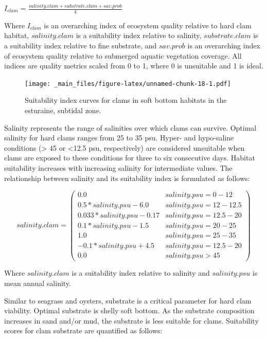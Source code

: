 \documentclass[
]{book}
\begin{document}
\(I_{clam} = \frac{salinity.clam + substrate.clam + sav.prob}{4}\)

Where \(I_{clam}\) is an overarching index of ecosystem quality relative to hard clam habitat, \(salinity.clam\) is a suitability index relative to salinity, \(substrate.clam\) is a suitability index relative to fine substrate, and \(sav.prob\) is an overarching index of ecosystem quality relative to submerged aquatic vegetation coverage. All indices are quality metrics scaled from 0 to 1, where 0 is unsuitable and 1 is ideal.

\begin{figure}
\centering
\texttt{[image: \_main\_files/figure-latex/unnamed-chunk-18-1.pdf]}
\caption{\label{fig:unnamed-chunk-18}Suitability index curves for clams in soft bottom habitats in the esturaine, subtidal zone.}
\end{figure}

Salinity represents the range of salinities over which clams can survive. Optimal salinity for hard clams ranges from 25 to 35 psu. Hyper- and hypo-saline conditions (\textgreater{} 45 or \textless12.5 psu, respectively) are considered unsuitable when clams are exposed to these conditions for three to six consecutive days. Habitat suitability increases with increasing salinity for intermediate values. The relationship between salinity and its suitability index is formulated as follows:

\[salinity.clam = \begin{pmatrix} 0.0 & salinity.psu=0-12\\
0.5*salinity.psu-6.0 & salinity.psu=12-12.5\\
0.033*salinity.psu-0.17 & salinity.psu=12.5-20\\
0.1*salinity.psu-1.5 & salinity.psu=20-25\\
1.0 & salinity.psu=25-35\\
-0.1*salinity.psu+4.5 & salinity.psu=12.5-20\\
0.0 & salinity.psu>45
\end{pmatrix}\]

Where \(salinity.clam\) is a suitability index relative to salinity and \(salinity.psu\) is mean annual salinity.

Similar to seagrass and oysters, substrate is a critical parameter for hard clam viability. Optimal substrate is shelly soft bottom. As the substrate composition increases in sand and/or mud, the substrate is less suitable for clams. Suitability scores for clam substrate are quantified as follows:
\end{document}
